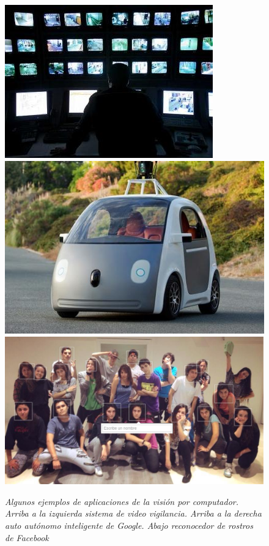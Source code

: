 \begin{figure}[htc]
  \centering
  \includegraphics[scale=.42]{images/vigilancia}
  \includegraphics[scale=.36]{images/googleauto}
  \includegraphics[scale=.25]{images/faces}
  \caption{\em Algunos ejemplos de aplicaciones de la visión por computador. Arriba a la izquierda sistema de video vigilancia. Arriba a la derecha auto autónomo inteligente de Google. Abajo reconocedor de rostros de Facebook}  
  \label{fig:ejemplosaplicacion}
\end{figure}


